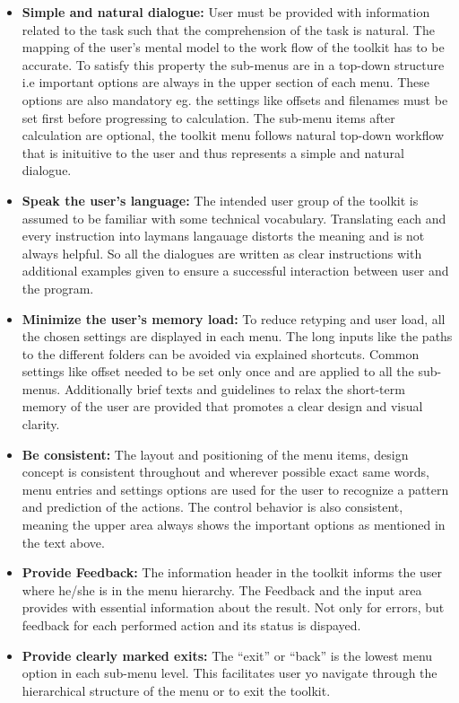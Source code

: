\begin{itemize}
	\item \textbf{Simple and natural dialogue:} User must be provided with information related to the task such that the comprehension of the task is natural. The mapping of the user's mental model to the work flow of the toolkit has to be accurate. To satisfy this property the sub-menus are in a top-down structure i.e important options are always in the upper section of each menu. These options are also mandatory eg. the settings like offsets and filenames must be set first before
		progressing to calculation. The sub-menu items after calculation are optional, the toolkit menu follows natural top-down workflow that is inituitive to the user and thus represents a simple and natural dialogue.
	\item \textbf{Speak the user's language:} The intended user group of the toolkit is assumed to be familiar with some technical vocabulary. Translating each and every instruction into laymans langauage distorts the meaning and is not always helpful. So all the dialogues are written as clear instructions with additional examples given to ensure a successful interaction between user and the program.
	\item \textbf{Minimize the user's memory load:} To reduce retyping and user load, all the chosen settings are displayed in each menu. The long inputs like the paths to the different folders can be avoided via explained shortcuts. Common settings like offset needed to be set only once and are applied to all the sub-menus. Additionally brief texts and guidelines to relax the short-term memory of the user are provided that promotes a clear design and visual clarity.
	\item \textbf{Be consistent:} The layout and positioning of the menu items, design concept is consistent throughout and wherever possible exact same words, menu entries and settings options are used for the user to recognize a pattern and prediction of the actions. The control behavior is also consistent, meaning the upper area always shows the important options as mentioned in the text above.
	\item \textbf{Provide Feedback:} The information header in the toolkit informs the user where he/she is in the menu hierarchy. The Feedback and the input area provides with essential information about the result. Not only for errors, but feedback for each performed action and its status is dispayed.
	\item \textbf{Provide clearly marked exits:} The ``exit'' or ``back'' is the lowest menu option in each sub-menu level. This facilitates user yo navigate through the hierarchical structure of the menu or to exit the toolkit.

\end{itemize}
